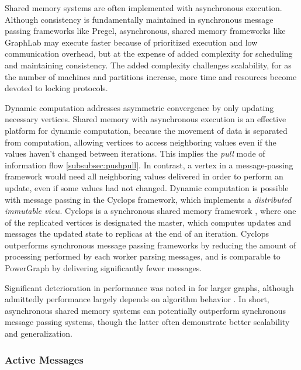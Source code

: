 \documentclass[reprint,twocolumn,showpacs,preprintnumbers,amsmath, aps,pre,amssymb]{revtex4-1}
\begin{document}
Shared memory systems are often implemented with asynchronous execution.  Although consistency is fundamentally maintained in synchronous message passing frameworks like Pregel, asynchronous, shared memory frameworks like GraphLab may execute faster because of prioritized execution and low communication overhead, but at the expense of added complexity for scheduling and maintaining consistency.  The added complexity challenges scalability, for as the number of machines and partitions increase, more time and resources become devoted to locking protocols.  

Dynamic computation addresses asymmetric convergence by only updating necessary vertices.  Shared memory with asynchronous execution is an effective platform for dynamic computation, because the movement of data is separated from computation, allowing vertices to access neighboring values even if the values haven't changed between iterations.  This implies the {\em pull} mode of information flow \ref{subsubsec:pushpull}.  In contrast, a vertex in a message-passing framework would need all neighboring values delivered in order to perform an update, even if some values had not changed.  Dynamic computation is possible with message passing in the Cyclops framework, which implements a {\em distributed immutable view}.  Cyclops is a synchronous shared memory framework \cite{Chen2014}, where one of the replicated vertices is designated the master, which computes updates and messages the updated state to replicas at the end of an iteration.  Cyclops outperforms synchronous message passing frameworks by reducing the amount of processing performed by each worker parsing messages, and is comparable to PowerGraph by delivering significantly fewer messages.

Significant deterioration in performance was noted in \cite{Han2014,Lu2014} for larger graphs, although admittedly performance largely depends on algorithm behavior \cite{Xie2013,Shang2013}.  In short, asynchronous shared memory systems can potentially outperform synchronous message passing systems, though the latter often demonstrate better scalability and generalization.

\subsubsection{Active Messages}
\label{subsubsec:acivemsg}
\end{document}
